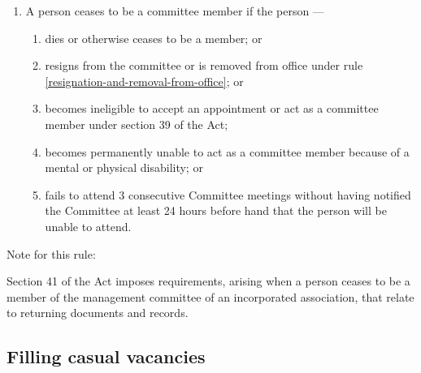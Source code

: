 \documentclass[../constitution.tex]{subfiles}
\begin{document}
\begin{enumerate}

\item A person ceases to be a committee member if the person ---

  \begin{enumerate}
  
  \item dies or otherwise ceases to be a member; or
  \item resigns from the committee or is removed from office under rule \ref{resignation-and-removal-from-office}; or
  \item becomes ineligible to accept an appointment or act as a committee member under section 39 of the Act;
  \item becomes permanently unable to act as a committee member because of a mental or physical disability; or
  \item fails to attend 3 consecutive Committee meetings without having notified the Committee at least 24 hours before hand that the person will be unable to attend. 
  \end{enumerate}
\end{enumerate}


Note for this rule: 

Section 41 of the Act imposes requirements, arising when a person ceases to be a member of the management committee of an incorporated association, that relate to returning documents and records. 

\hypertarget{filling-casual-vacancies}{%
\subsection{Filling casual vacancies}\label{filling-casual-vacancies}}
\end{document}
